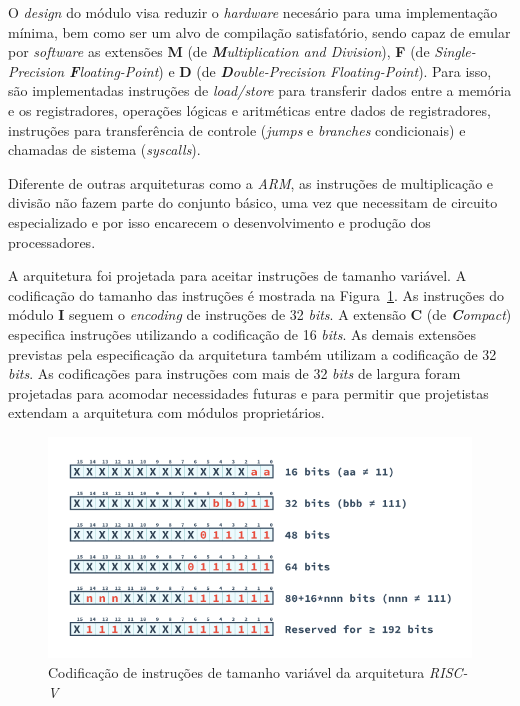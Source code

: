 { O \textit{design} do módulo visa reduzir o \textit{hardware} necesário para
    uma implementação mínima, bem como ser um alvo de compilação satisfatório,
    sendo capaz de emular por \textit{software} as extensões \textbf{M}
    (de \textit{\textbf{M}ultiplication and Division}), \textbf{F} (de
    \textit{Single-Precision \textbf{F}loating-Point}) e \textbf{D} (de
    \textit{\textbf{D}ouble-Precision Floating-Point}). Para isso, são
    implementadas instruções de \textit{load/store} para transferir dados
    entre a memória e os registradores, operações lógicas e aritméticas
    entre dados de registradores, instruções para transferência de controle
    (\textit{jumps} e \textit{branches} condicionais) e chamadas de sistema
    (\textit{syscalls}).
}

{ Diferente de outras arquiteturas como a \textit{ARM}, as instruções de
    multiplicação e divisão não fazem parte do conjunto básico, uma vez que
    necessitam de circuito especializado e por isso encarecem o desenvolvimento
    e produção dos processadores.
}

{ A arquitetura foi projetada para aceitar instruções de tamanho variável.
    A codificação do tamanho das instruções é mostrada na
    Figura~\ref{fig:riscv_var_length}. As instruções do módulo \textbf{I}
    seguem o \textit{encoding} de instruções de 32 \textit{bits}. A extensão
    \textbf{C} (de \textit{\textbf{C}ompact}) especifica instruções utilizando
    a codificação de 16 \textit{bits}. As demais extensões previstas pela
    especificação da arquitetura também utilizam a codificação de 32
    \textit{bits}. As codificações para instruções com mais de 32
    \textit{bits} de largura foram projetadas para acomodar necessidades
    futuras e para permitir que projetistas extendam a arquitetura com módulos
    proprietários.
}

\begin{figure}[H]
\centering
    \includegraphics[width=.8\linewidth]{../images/RV_InstructionLength.png}
    \caption{Codificação de instruções de tamanho variável da arquitetura
                \textit{RISC-V}}\label{fig:riscv_var_length}
\end{figure}



